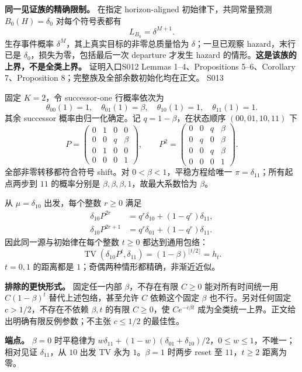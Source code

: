 \documentclass[11pt,a4paper]{article}
\newcommand{\TV}{\operatorname{TV}}\newcommand{\E}{\mathbb E}
\newcommand{\dd}{\delta}
\newcommand{\head}[2]{{\small\sffamily #1}\par\vspace{2pt}{\LARGE\bfseries #2}\par\vspace{5pt}}
\newcommand{\entry}[1]{\vfill\noindent\small 证明入口\quad #1\normalsize}
\begin{document}
\textbf{同一见证族的精确限制。} 在指定 horizon-aligned 初始律下，共同常量预测 $B_0(H)=\delta_0$ 对每个符号表都有
\[
 L_{B_0}=\dd^{M+1}.
\]
生存事件概率 $\dd^M$，其上真实目标的非零总质量恰为 $\dd$；一旦已观察 hazard，末行已是 $\delta_0$，损失为零，包括最后一次 departure 才发生 hazard 的情形。\textbf{这是该族的上界，不是全类上界。}
\entry{S012 Lemmas 1--4、Propositions 5--6、Corollary 7、Proposition 8；完整族及全部余数初始化均在正文。}
\newpage
\head{S013}{状态律混合慢并不推出统计困难}
固定 $K=2$，令 successor-one 行概率依次为
\[
 \theta_{00}(1)=1,\quad\theta_{01}(1)=\beta,\quad
 \theta_{10}(1)=1,\quad\theta_{11}(1)=1.
\]
其余 successor 概率由归一化确定。记 $q=1-\beta$，在状态顺序 $(00,01,10,11)$ 下
\[
 P=\begin{pmatrix}0&1&0&0\\0&0&q&\beta\\0&1&0&0\\0&0&0&1\end{pmatrix},\qquad
 P^2=\begin{pmatrix}0&0&q&\beta\\0&q&0&\beta\\0&0&q&\beta\\0&0&0&1\end{pmatrix}.
\]
全部非零转移都符合符号 shift。对 $0<\beta<1$，平稳方程给唯一 $\pi=\delta_{11}$；所有起点两步到 $11$ 的概率分别是 $\beta,\beta,\beta,1$，故最大系数恰为 $\beta$。

从 $\mu=\delta_{10}$ 出发，每个整数 $r\ge0$ 满足
\begin{align*}
 \delta_{10}P^{2r}&=q^r\delta_{10}+(1-q^r)\delta_{11},\\
 \delta_{10}P^{2r+1}&=q^r\delta_{01}+(1-q^r)\delta_{11}.
\end{align*}
因此同一源与初始律在每个整数 $t\ge0$ 都达到通用包络：
\[
 \TV(\delta_{10}P^t,\delta_{11})=(1-\beta)^{\lfloor t/2\rfloor}=h_t.
\]
$t=0,1$ 的距离都是 $1$；奇偶两种情形都精确，非渐近近似。

\textbf{排除的更快形式。} 固定任一内部 $\beta$，不存在有限 $C\ge0$ 能对所有时间统一用 $C(1-\beta)^t$ 替代上述包络，甚至允许 $C$ 依赖这个固定 $\beta$ 也不行。另对任何固定 $c>1/2$，不存在不依赖 $\beta,t$ 的有限 $C\ge0$，使 $C e^{-c\beta t}$ 成为全类统一上界。正文给出明确有限反例参数；不主张 $c\le1/2$ 的最佳性。

\textbf{端点。} $\beta=0$ 时平稳律为
$w\delta_{11}+(1-w)(\delta_{01}+\delta_{10})/2$，$0\le w\le1$，不唯一；相对见证 $\delta_{11}$，从 $10$ 出发 TV 永为 $1$。$\beta=1$ 时两步 reset 至 $11$，$t\ge2$ 距离为零。
\end{document}
